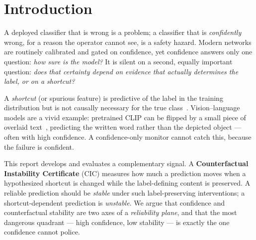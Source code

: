 \documentclass[11pt]{article}
\begin{document}
\begin{abstract}
The scope is deliberately bounded. CIC intervenes on and repairs a supplied finite
family of shortcut interventions; it makes \textbf{no} claim of open-world shortcut
discovery, exact bounding-box localization, general robustness, or
cross-shortcut transfer/universal repair (the frozen text policy does not transfer
to a weak-channel watermark shortcut). On theory, the strong \emph{global}
input-independent embedding-additivity assumption fails for OpenCLIP text overlays
--- the per-image shift is object-entangled --- but the weaker per-input
class-balance premise the recovery theorem actually needs is supported.
\end{abstract}

\clearpage
\setcounter{page}{1}

\section{Introduction}
A deployed classifier that is wrong is a problem; a classifier that is
\emph{confidently} wrong, for a reason the operator cannot see, is a safety hazard.
Modern networks are routinely calibrated and gated on confidence, yet confidence
answers only one question: \emph{how sure is the model?} It is silent on a second,
equally important question: \emph{does that certainty depend on evidence that
actually determines the label, or on a shortcut?}

A \emph{shortcut} (or spurious feature) is predictive of the label in the training
distribution but is not causally necessary for the true class~\cite{geirhos2020shortcut}.
Vision--language models are a vivid example: pretrained CLIP can be flipped by a
small piece of overlaid text~\cite{goh2021multimodal,radford2021clip}, predicting the
written word rather than the depicted object --- often with high confidence. A
confidence-only monitor cannot catch this, because the failure is confident.

This report develops and evaluates a complementary signal. A
\textbf{Counterfactual Instability Certificate} (CIC) measures how much a
prediction moves when a hypothesized shortcut is changed while the label-defining
content is preserved. A reliable prediction should be \emph{stable} under such
label-preserving interventions; a shortcut-dependent prediction is \emph{unstable}.
We argue that confidence and counterfactual stability are two axes of a
\emph{reliability plane}, and that the most dangerous quadrant --- high confidence,
low stability --- is exactly the one confidence cannot police.
\end{document}
